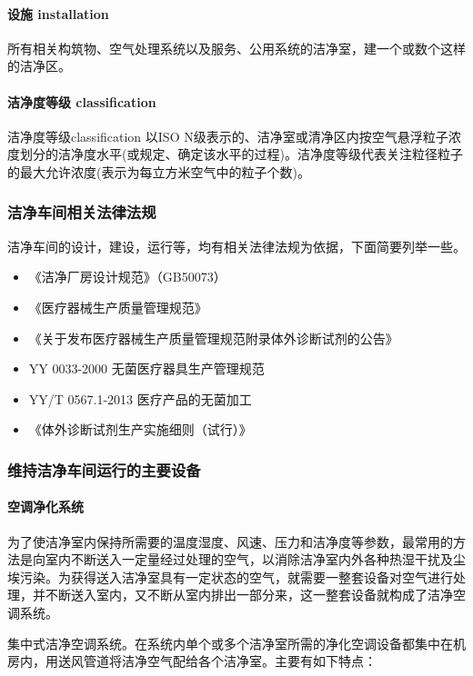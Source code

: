 \documentclass[cn,black,12pt,normal]{elegantnote}
\begin{document}
\paragraph{设施 installation} 所有相关构筑物、空气处理系统以及服务、公用系统的洁净室，建一个或数个这样的洁净区。

\paragraph{洁净度等级 classification} 洁净度等级classification 以ISO N级表示的、洁净室或清净区内按空气悬浮粒子浓度划分的洁净度水平(或规定、确定该水平的过程)。洁净度等级代表关注粒径粒子的最大允许浓度(表示为每立方米空气中的粒子个数)。

\subsubsection{洁净车间相关法律法规}

洁净车间的设计，建设，运行等，均有相关法律法规为依据，下面简要列举一些。
\begin{itemize}
    \item 《洁净厂房设计规范》（GB50073）
    \item 《医疗器械生产质量管理规范》
    \item 《关于发布医疗器械生产质量管理规范附录体外诊断试剂的公告》
    \item YY 0033-2000 无菌医疗器具生产管理规范
    \item YY/T 0567.1-2013 医疗产品的无菌加工
    \item 《体外诊断试剂生产实施细则（试行）》
\end{itemize}

\subsubsection{维持洁净车间运行的主要设备}

\paragraph{空调净化系统} 为了使洁净室内保持所需要的温度湿度、风速、压力和洁净度等参数，最常用的方法是向室内不断送入一定量经过处理的空气，以消除洁净室内外各种热湿干扰及尘埃污染。为获得送入洁净室具有一定状态的空气，就需要一整套设备对空气进行处理，并不断送入室内，又不断从室内排出一部分来，这一整套设备就构成了洁净空调系统。

集中式洁净空调系统。在系统内单个或多个洁净室所需的净化空调设备都集中在机房内，用送风管道将洁净空气配给各个洁净室。主要有如下特点：
\end{document}
